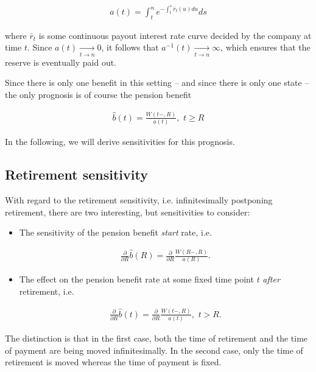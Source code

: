 \documentclass{book}
\newcommand{\1}[1]{\mathbbm{1}_{\left\lbrace #1 \right\rbrace}}
\theoremstyle{break}
\theoremstyle{remark}
\numberwithin{equation}{section}
\begin{document}
\begin{align*}
	a(t) = \int_t^n e^{-\int_t^s \bar{r}_t(u) du} ds
\end{align*}

where $\bar{r}_t$ is some continuous payout interest rate curve decided by the company at time $t$. Since $a(t) \underset{t \to n}{\longrightarrow} 0$, it follows that $a^{-1}(t) \underset{t \to n}{\longrightarrow} \infty$, which ensures that the reserve is eventually paid out.

Since there is only one benefit in this setting -- and since there is only one state -- the only prognosis is of course the pension benefit

\begin{align*}
	\hat{b}(t) = \frac{W(t-,R)}{a(t)}, \, \, t \geq R
\end{align*}

In the following, we will derive sensitivities for this prognosis.

\subsection{Retirement sensitivity}

With regard to the retirement sensitivity, i.e. infinitesimally postponing retirement, there are two interesting, but sensitivities to consider:

\begin{itemize}
	\item The sensitivity of the pension benefit \textit{start} rate, i.e.
	
	\begin{align} \label{StartPens}
		\frac{\partial}{\partial R} \hat{b}(R) = \frac{\partial}{\partial R} \frac{W(R-,R)}{a(R)}.
	\end{align}

	\item The effect on the pension benefit rate at some fixed time point $t$ \textit{after} retirement, i.e.
	
	\begin{align} \label{LaterPens}
		\frac{\partial}{\partial R} \hat{b}(t) = \frac{\partial}{\partial R} \frac{W(t-,R)}{a(t)}, \, \, t > R.
	\end{align}
	
\end{itemize}

The distinction is that in the first case, both the time of retirement and the time of payment are being moved infinitesimally. In the second case, only the time of retirement is moved whereas the time of payment is fixed.
\end{document}
